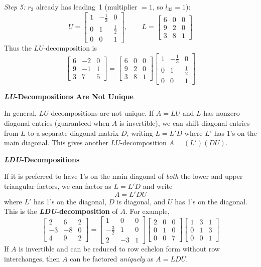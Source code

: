 \documentclass{article}
\newcommand{\redheading}[1]{{\vspace{2mm}\noindent\Large\bfseries\color{red!55!black} #1\par}\vspace{2mm}}
\begin{document}
\noindent\textit{Step 5:} $r_3$ already has leading~1 (multiplier $=1$, so $l_{33}=1$):
\[
U = \begin{bmatrix}1&-\frac{1}{3}&0\\0&1&\frac{1}{2}\\0&0&1\end{bmatrix},\qquad
L = \begin{bmatrix}6&0&0\\9&2&0\\3&8&1\end{bmatrix}
\]
Thus the $LU$-decomposition is
\[
  \begin{bmatrix}6&-2&0\\9&-1&1\\3&7&5\end{bmatrix}
  = \begin{bmatrix}6&0&0\\9&2&0\\3&8&1\end{bmatrix}
    \begin{bmatrix}1&-\frac{1}{3}&0\\0&1&\frac{1}{2}\\0&0&1\end{bmatrix}
\]

\vspace{2mm}
\redheading{\textit{LU}-Decompositions Are Not Unique}

In general, $LU$-decompositions are not unique. If $A = LU$ and $L$ has nonzero diagonal
entries (guaranteed when $A$ is invertible), we can shift diagonal entries from $L$ to a
separate diagonal matrix $D$, writing $L = L'D$ where $L'$ has 1's on the main diagonal.
This gives another $LU$-decomposition $A = (L')(DU)$.

\vspace{2mm}
\redheading{\textit{LDU}-Decompositions}

If it is preferred to have 1's on the main diagonal of \emph{both} the lower and upper
triangular factors, we can factor as $L = L'D$ and write
\[
  A = L'DU
\]
where $L'$ has 1's on the diagonal, $D$ is diagonal, and $U$ has 1's on the diagonal.
This is the \textbf{\textit{LDU}-decomposition} of $A$. For example,
\[
  \begin{bmatrix}2&6&2\\-3&-8&0\\4&9&2\end{bmatrix}
  = \begin{bmatrix}1&0&0\\-\frac{3}{2}&1&0\\2&-3&1\end{bmatrix}
    \begin{bmatrix}2&0&0\\0&1&0\\0&0&7\end{bmatrix}
    \begin{bmatrix}1&3&1\\0&1&3\\0&0&1\end{bmatrix} \tag{13}
\]
If $A$ is invertible and can be reduced to row echelon form without row interchanges,
then $A$ can be factored \emph{uniquely} as $A = LDU$.
\end{document}
